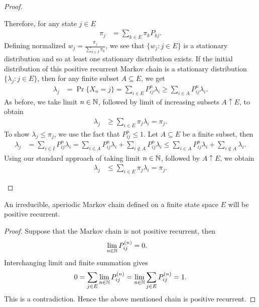 \documentclass[a4paper,10pt,english]{article}
\begin{document}
\begin{proof}
\begin{enumerate}[i)]
Therefore, for any state $j \in E$
\begin{align*}
\pi_j &= \sum_{k \in E} \pi_k P_{kj}.
\end{align*}
Defining normalized $w_j = \frac{\pi_j}{\sum_{k \in I}\pi_k}$, 
we see that $\{w_j : j \in E\}$ is a stationary distribution and so at least one stationary distribution exists. 
If the initial distribution of this positive recurrent Markov chain is a stationary distribution $\{\lambda_j : j \in E\}$, 
then for any finite subset $A \subseteq E$, we get 
\begin{align*}
\lambda_j &= \Pr\{X_n = j\} %
= \sum_{i \in E} P_{ij}^n\lambda_i \geq \sum_{i \in A} P_{ij}^n\lambda_i.
\end{align*}
As before, we take limit $n \in \mathbb{N}$, followed by limit of increasing subsets $A \uparrow E$, to obtain
\begin{align*}
\lambda_j &\geq \sum_{i \in E} \pi_j \lambda_i = \pi_j.
\end{align*}
To show $\lambda_j \leq \pi_j$, we use the fact that $P_{ij}^n \leq 1$. 
Let $A \subseteq E$ be a finite subset, then
\begin{align*}
\lambda_j &= \sum_{i \in I} P_{ij}^n\lambda_i = \sum_{i \in A}P_{ij}^n\lambda_i + \sum_{i \notin A}P_{ij}^n\lambda_i \leq \sum_{i \in A} P_{ij}^{n}\lambda_i + \sum_{i \notin A} \lambda_i.
\end{align*}
Using our standard approach of taking limit $n \in \mathbb{N}$, followed by $A \uparrow E$, we obtain
\begin{align*}
\lambda_j &\leq \sum_{i \in E} \pi_j \lambda_i = \pi_j.
\end{align*}
\end{enumerate}
\end{proof}

\begin{cor} 
An irreducible, aperiodic Markov chain defined on a finite state space $E$ will be positive recurrent.
\end{cor}
\begin{proof}
Suppose that the Markov chain is not positive recurrent, then 
\begin{align*}
\lim_{n \in \mathbb{N}}P_{ij}^{(n)} &= 0.
\end{align*}
Interchanging limit and finite summation gives
\begin{align*}
0 = \sum_{j \in E}\lim_{n \in \mathbb{N}}P_{ij}^{(n)}  = \lim_{n \in \mathbb{N}}\sum_{j \in E}P_{ij}^{(n)} = 1.
\end{align*}
This is a contradiction. 
Hence the above mentioned chain is positive recurrent.
\end{proof}
\end{document}
